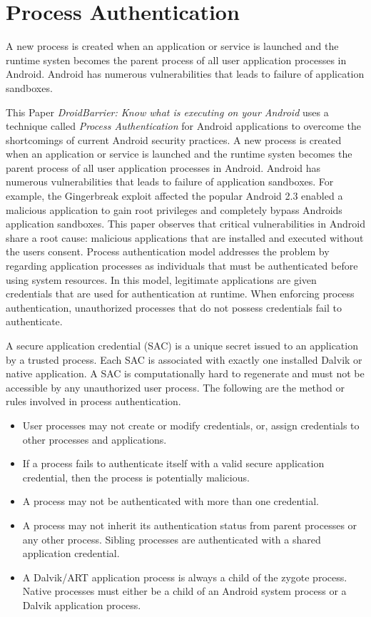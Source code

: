 \documentclass[12pt]{report}
\begin{document}
\section{Process Authentication}

A new process is created when an application or service is launched and the runtime systen becomes the parent process of all user application processes in Android. 
Android has numerous vulnerabilities that leads to failure of application sandboxes.

This Paper \textit{DroidBarrier: Know what is executing on your Android}\citep{almohri2014} uses a technique called \textit{Process  Authentication}  for  Android  applications  to  overcome
the shortcomings of current Android security practices.
A new process is created when an application or service is launched and the runtime systen becomes the parent process of all user application processes in Android. 
Android has numerous vulnerabilities that leads to failure of application sandboxes. For  example, the
Gingerbreak
exploit  affected  the  popular  Android  2.3  enabled  a  malicious  application  to  gain
root
privileges  and
completely  bypass  Android\textquotesingle s  application  sandboxes.
This paper observes that critical vulnerabilities in Android share a root cause: malicious applications that are installed and executed without the user\textquotesingle s consent.
Process
authentication  model  addresses  the  problem  by  regarding
application processes as individuals that must be authenticated  before  using  system  resources. In  this  model,  legitimate  applications  are  given  credentials  that  are  used  for
authentication at runtime.  When enforcing process authentication, unauthorized processes that do not possess credentials  fail  to  authenticate.

A secure application credential (SAC) is a unique secret issued to an application by a trusted process. Each SAC is associated with exactly one installed Dalvik or native application. A SAC is computationally hard to regenerate and must not be accessible by any unauthorized user process.
The following are the method or rules involved in process authentication.
\begin{itemize}
\item User processes  may not create or modify credentials, or, assign credentials to other processes and applications.
\item If a process fails to authenticate itself with a valid secure application credential, then the process is potentially malicious.
\item A process may not be authenticated with more than one credential.
\item A process may not inherit its authentication status from parent processes or any other process. Sibling processes are authenticated with a shared application credential.
\item A Dalvik/ART application process is always a child of the zygote process. Native processes must either be a child of an Android system process or a Dalvik application process.
\end{itemize}
\end{document}
